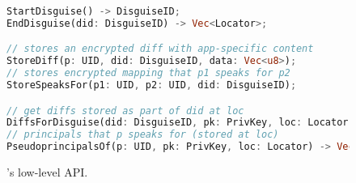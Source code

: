 \begin{figure}[t]
\begin{lstlisting}[language=Rust, style=rust]
StartDisguise() -> DisguiseID;
EndDisguise(did: DisguiseID) -> Vec<Locator>;

// stores an encrypted diff with app-specific content
StoreDiff(p: UID, did: DisguiseID, data: Vec<u8>);
// stores encrypted mapping that p1 speaks for p2
StoreSpeaksFor(p1: UID, p2: UID, did: DisguiseID);

// get diffs stored as part of did at loc
DiffsForDisguise(did: DisguiseID, pk: PrivKey, loc: Locator) -> Vec<Vec<u8>>;
// principals that p speaks for (stored at loc)
PseudoprincipalsOf(p: UID, pk: PrivKey, loc: Locator) -> Vec<UID>;
\end{lstlisting}
\caption{\sys's low-level API.}
\label{f:api-low}
\end{figure}


